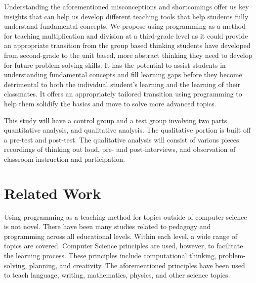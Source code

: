 \documentclass[12pt]{article}
\begin{document}
Understanding the aforementioned misconceptions and shortcomings offer us key insights that can help us develop different teaching tools that help students fully understand fundamental concepts.
We propose using programming as a method for teaching multiplication and division at a third-grade level as it could provide an appropriate transition from the group based thinking students have developed from second-grade to the unit based, more abstract thinking they need to develop for future problem-solving skills.
It has the potential to assist students in understanding fundamental concepts and fill learning gaps before they become detrimental to both the individual student’s learning and the learning of their classmates.
It offers an appropriately tailored transition using programming to help them solidify the basics and move to solve more advanced topics.

This study will have a control group and a test group involving two parts, quantitative analysis, and qualitative analysis.
The qualitative portion is built off a pre-test and post-test.
The qualitative analysis will consist of various pieces: recordings of thinking out loud, pre- and post-interviews, and observation of classroom instruction and participation.


\section*{Related Work}
\cite{sherin}

Using programming as a teaching method for topics outside of computer science is not novel.
There have been many studies related to pedagogy and programming across all educational levels.
Within each level, a wide range of topics are covered.
Computer Science principles are used, however, to facilitate the learning process.
These principles include computational thinking, problem-solving, planning, and creativity.
The aforementioned principles have been used to teach language, writing, mathematics, physics, and other science topics.
\end{document}

